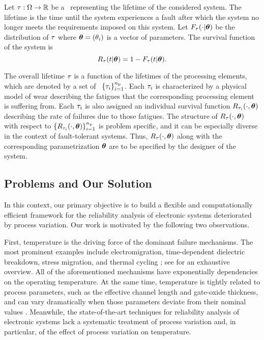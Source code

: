 Let $\tau: \Omega \to \mathbb{R}$ be a \rv\ representing the lifetime of the considered system.
The lifetime is the time until the system experiences a fault after which the system no longer meets the requirements imposed on this system.
Let $F_\tau(\cdot | \bm{\theta})$ be the distribution of $\tau$ where $\bm{\theta} = (\theta_i)$ is a vector of parameters.
The survival function of the system is
\[
  R_\tau(t | \bm{\theta}) = 1 - F_\tau(t | \bm{\theta}).
\]

The overall lifetime $\tau$ is a function of the lifetimes of the processing elements, which are denoted by a set of \rvs\ $\{ \tau_i \}_{i = 1}^{n_\text{p}}$.
Each $\tau_i$ is characterized by a physical model of wear \cite{jedec2011} describing the fatigues that the corresponding processing element is suffering from.
Each $\tau_i$ is also assigned an individual survival function $R_{\tau_i}(\cdot, \bm{\theta})$ describing the rate of failures due to those fatigues.
The structure of $R_\tau(\cdot, \bm{\theta})$ with respect to $\{ R_{\tau_i}(\cdot, \bm{\theta}) \}_{i = 1}^{n_\text{p}}$ is problem specific, and it can be especially diverse in the context of fault-tolerant systems.
Thus, $R_\tau(\cdot, \bm{\theta})$ along with the corresponding parametrization $\bm{\theta}$ are to be specified by the designer of the system.

\subsection{Problems and Our Solution}
In this context, our primary objective is to build a flexible and computationally efficient framework for the reliability analysis of electronic systems deteriorated by process variation.
Our work is motivated by the following two observations.

First, temperature is the driving force of the dominant failure mechanisms.
The most prominent examples include electromigration, time-dependent dielectric breakdown, stress migration, and thermal cycling \cite{xiang2010}; see \cite{jedec2011} for an exhaustive overview.
All of the aforementioned mechanisms have exponentially dependencies on the operating temperature.
At the same time, temperature is tightly related to process parameters, such as the effective channel length and gate-oxide thickness, and can vary dramatically when those parameters deviate from their nominal values \cite{ukhov2014, juan2012}.
Meanwhile, the state-of-the-art techniques for reliability analysis of electronic systems lack a systematic treatment of process variation and, in particular, of the effect of process variation on temperature.

